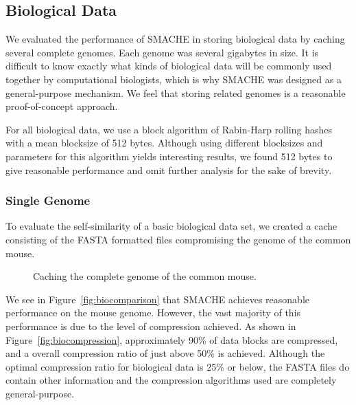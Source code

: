 \documentclass{sigplanconf}[11pt]
\begin{document}
\subsection{Biological Data}

We evaluated the performance of SMACHE in storing biological data by caching
several complete genomes.  Each genome was several gigabytes in size. It is
difficult to know exactly what kinds of biological data will be commonly used
together by computational biologists, which is why SMACHE was designed as a
general-purpose mechanism.  We feel that storing related genomes is a
reasonable proof-of-concept approach. 

For all biological data, we use a block algorithm of Rabin-Harp rolling hashes
with a mean blocksize of 512 bytes.  Although using different blocksizes and
parameters for this algorithm yields interesting results, we found 512 bytes to
give reasonable performance and omit further analysis for the sake of brevity.

\subsubsection*{Single Genome}

To evaluate the self-similarity of a basic biological data set, we created a
cache consisting of the FASTA formatted files compromising the genome of the
common mouse.

\begin{figure}
\begin{center}
\caption{Caching the complete genome of the common mouse.}
\end{center}
\end{figure}

We see in Figure~\ref{fig:biocomparison} that SMACHE achieves reasonable
performance on the mouse genome.  However, the vast majority of this
performance is due to the level of compression achieved.  As shown in
Figure~\ref{fig:biocompression}, approximately 90\% of data blocks are
compressed, and a overall compression ratio of just above 50\% is achieved.
Although the optimal compression ratio for biological data is 25\% or below,
the FASTA files do contain other information and the compression algorithms
used are completely general-purpose.
\end{document}
